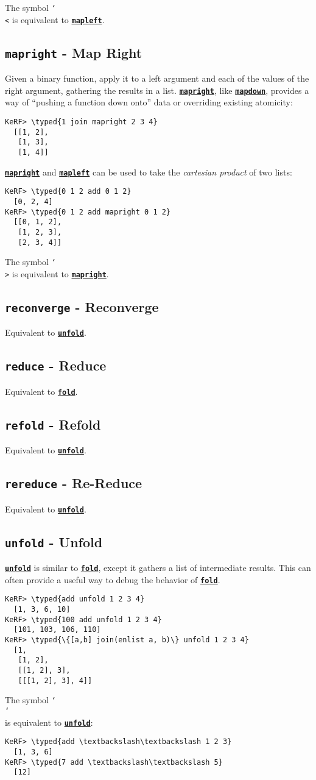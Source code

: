 \documentclass{article}
\newcommand{\typed}[1]{\textcolor{TealBlue}{#1}}
\newcommand{\primdefu}[3]{\subsection{\texttt{#1} - #2}\label{prim:#3}}
\newcommand{\primu}[2]{\hyperref[prim:#2]{\textbf{\texttt{#1}}}}
\newcommand{\combdef}[2]{\primdefu{#1}{#2}{#1}}
\newcommand{\comb}[1]{\primu{#1}{#1}}
\begin{document}
The symbol \texttt{\char`\\<} is equivalent to \comb{mapleft}.

\combdef{mapright}{Map Right}

Given a binary function, apply it to a left argument and each of the values of the right argument, gathering the results in a list. \comb{mapright}, like \comb{mapdown}, provides a way of ``pushing a function down onto'' data or overriding existing atomicity:
\begin{Verbatim}
KeRF> \typed{1 join mapright 2 3 4}
  [[1, 2], 
   [1, 3], 
   [1, 4]]
\end{Verbatim}

\comb{mapright} and \comb{mapleft} can be used to take the \emph{cartesian product} of two lists:
\begin{Verbatim}
KeRF> \typed{0 1 2 add 0 1 2}
  [0, 2, 4]
KeRF> \typed{0 1 2 add mapright 0 1 2}
  [[0, 1, 2], 
   [1, 2, 3], 
   [2, 3, 4]]
\end{Verbatim}

The symbol \texttt{\char`\\>} is equivalent to \comb{mapright}.

\combdef{reconverge}{Reconverge}

Equivalent to \comb{unfold}.

\combdef{reduce}{Reduce}

Equivalent to \comb{fold}.

\combdef{refold}{Refold}

Equivalent to \comb{unfold}.

\combdef{rereduce}{Re-Reduce}

Equivalent to \comb{unfold}.

\combdef{unfold}{Unfold}

\comb{unfold} is similar to \comb{fold}, except it gathers a list of intermediate results. This can often provide a useful way to debug the behavior of \comb{fold}.
\begin{Verbatim}
KeRF> \typed{add unfold 1 2 3 4}
  [1, 3, 6, 10]
KeRF> \typed{100 add unfold 1 2 3 4}
  [101, 103, 106, 110]
KeRF> \typed{\{[a,b] join(enlist a, b)\} unfold 1 2 3 4}
  [1, 
   [1, 2], 
   [[1, 2], 3], 
   [[[1, 2], 3], 4]]
\end{Verbatim}

The symbol \texttt{\char`\\\char`\\} is equivalent to \comb{unfold}:
\begin{Verbatim}
KeRF> \typed{add \textbackslash\textbackslash 1 2 3}
  [1, 3, 6]
KeRF> \typed{7 add \textbackslash\textbackslash 5}
  [12]
\end{Verbatim}
\end{document}
